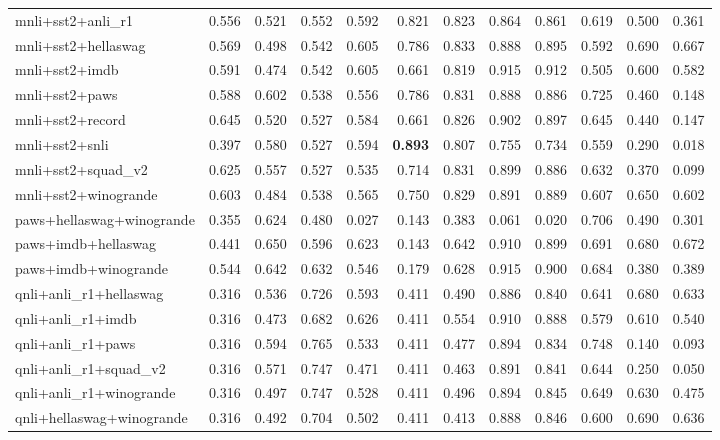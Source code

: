 \begin{table}[t]
\begin{tabular}{lrrrrrrrrrrr}
    mnli+sst2+anli\_r1 & 0.556 & 0.521 & 0.552 & 0.592 & 0.821 & 0.823 & 0.864 & 0.861 & 0.619 & 0.500 & 0.361 \\
    mnli+sst2+hellaswag & 0.569 & 0.498 & 0.542 & 0.605 & 0.786 & 0.833 & 0.888 & 0.895 & 0.592 & 0.690 & 0.667 \\
    mnli+sst2+imdb & 0.591 & 0.474 & 0.542 & 0.605 & 0.661 & 0.819 & 0.915 & 0.912 & 0.505 & 0.600 & 0.582 \\
    mnli+sst2+paws & 0.588 & 0.602 & 0.538 & 0.556 & 0.786 & 0.831 & 0.888 & 0.886 & 0.725 & 0.460 & 0.148 \\
    mnli+sst2+record & 0.645 & 0.520 & 0.527 & 0.584 & 0.661 & 0.826 & 0.902 & 0.897 & 0.645 & 0.440 & 0.147 \\
    mnli+sst2+snli & 0.397 & 0.580 & 0.527 & 0.594 & \textbf{0.893} & 0.807 & 0.755 & 0.734 & 0.559 & 0.290 & 0.018 \\
    mnli+sst2+squad\_v2 & 0.625 & 0.557 & 0.527 & 0.535 & 0.714 & 0.831 & 0.899 & 0.886 & 0.632 & 0.370 & 0.099 \\
    mnli+sst2+winogrande & 0.603 & 0.484 & 0.538 & 0.565 & 0.750 & 0.829 & 0.891 & 0.889 & 0.607 & 0.650 & 0.602 \\
    paws+hellaswag+winogrande & 0.355 & 0.624 & 0.480 & 0.027 & 0.143 & 0.383 & 0.061 & 0.020 & 0.706 & 0.490 & 0.301 \\
    paws+imdb+hellaswag & 0.441 & 0.650 & 0.596 & 0.623 & 0.143 & 0.642 & 0.910 & 0.899 & 0.691 & 0.680 & 0.672 \\
    paws+imdb+winogrande & 0.544 & 0.642 & 0.632 & 0.546 & 0.179 & 0.628 & 0.915 & 0.900 & 0.684 & 0.380 & 0.389 \\
    qnli+anli\_r1+hellaswag & 0.316 & 0.536 & 0.726 & 0.593 & 0.411 & 0.490 & 0.886 & 0.840 & 0.641 & 0.680 & 0.633 \\
    qnli+anli\_r1+imdb & 0.316 & 0.473 & 0.682 & 0.626 & 0.411 & 0.554 & 0.910 & 0.888 & 0.579 & 0.610 & 0.540 \\
    qnli+anli\_r1+paws & 0.316 & 0.594 & 0.765 & 0.533 & 0.411 & 0.477 & 0.894 & 0.834 & 0.748 & 0.140 & 0.093 \\
    qnli+anli\_r1+squad\_v2 & 0.316 & 0.571 & 0.747 & 0.471 & 0.411 & 0.463 & 0.891 & 0.841 & 0.644 & 0.250 & 0.050 \\
    qnli+anli\_r1+winogrande & 0.316 & 0.497 & 0.747 & 0.528 & 0.411 & 0.496 & 0.894 & 0.845 & 0.649 & 0.630 & 0.475 \\
    qnli+hellaswag+winogrande & 0.316 & 0.492 & 0.704 & 0.502 & 0.411 & 0.413 & 0.888 & 0.846 & 0.600 & 0.690 & 0.636 \\

\end{tabular}
\end{table}

